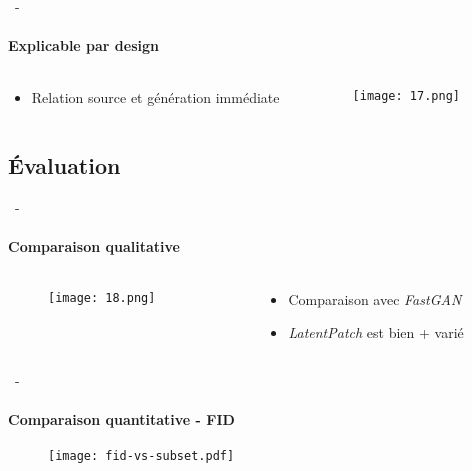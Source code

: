\documentclass[aspectratio=169, 22pt]{beamer}
\begin{document}
\begin{frame}{\secname~- \subsecname}
  \framesubtitle{Explicable par design}
  \begin{columns}
    \begin{column}{0.4\linewidth}
      \begin{itemize}
      \item Relation \alert{source} et \alert{génération} immédiate
      \end{itemize}
    \end{column}
    \begin{column}{0.6\linewidth}
      \begin{figure}
        \texttt{[image: 17.png]}
      \end{figure}  
    \end{column}
  \end{columns}  
\end{frame}

\subsection{Évaluation}
\begin{frame}{\secname~- \subsecname}
  \framesubtitle{Comparaison qualitative}
  \begin{columns}
    \begin{column}{0.75\linewidth}
      \begin{figure}
        \texttt{[image: 18.png]}
      \end{figure}
    \end{column}
    \begin{column}{0.25\linewidth}
      \begin{itemize}
      \item Comparaison avec \emph{FastGAN}
      \item \emph{LatentPatch} est bien + varié
      \end{itemize}
    \end{column}
  \end{columns}  
\end{frame}

\begin{frame}{\secname~- \subsecname}
  \framesubtitle{Comparaison quantitative - FID}
  \begin{figure}
    \texttt{[image: fid-vs-subset.pdf]}
  \end{figure}
\end{frame}
\end{document}
